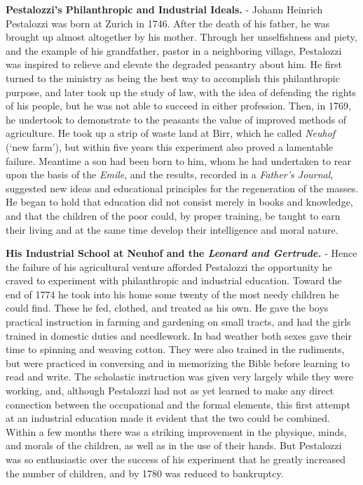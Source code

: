 \documentclass[]{book}
\begin{document}
\textbf{Pestalozzi's Philanthropic and Industrial Ideals.} - Johann Heinrich Pestalozzi was born at Zurich in 1746. After the death of his father, he was brought up almost altogether by his mother. Through her unselfishness and piety, and the example of his grandfather, pastor in a neighboring village, Pestalozzi was inspired to relieve and elevate the degraded peasantry about him. He first turned to the ministry as being the best way to accomplish this philanthropic purpose, and later took up the study of law, with the idea of defending the rights of his people, but he was not able to succeed in either profession. Then, in 1769, he undertook to demonstrate to the peasants the value of improved methods of agriculture. He took up a strip of waste land at Birr, which he called \emph{Neuhof} (`new farm'), but within five years this experiment also proved a lamentable failure. Meantime a son had been born to him, whom he had undertaken to rear upon the basis of the \emph{Emile}, and the results, recorded in a \emph{Father's Journal}, suggested new ideas and educational principles for the regeneration of the masses. He began to hold that education did not consist merely in books and knowledge, and that the children of the poor could, by proper training, be taught to earn their living and at the same time develop their intelligence and moral nature.

\textbf{His Industrial School at Neuhof and the \emph{Leonard and Gertrude.}} - Hence the failure of his agricultural venture afforded Pestalozzi the opportunity he craved to experiment with philanthropic and industrial education. Toward the end of 1774 he took into his home some twenty of the most needy children he could find. These he fed, clothed, and treated as his own. He gave the boys practical instruction in farming and gardening on small tracts, and had the girls trained in domestic duties and needlework. In bad weather both sexes gave their time to spinning and weaving cotton. They were also trained in the rudiments, but were practiced in conversing and in memorizing the Bible before learning to read and write. The scholastic instruction was given very largely while they were working, and, although Pestalozzi had not as yet learned to make any direct connection between the occupational and the formal elements, this first attempt at an industrial education made it evident that the two could be combined. Within a few months there was a striking improvement in the physique, minds, and morals of the children, as well as in the use of their hands. But Pestalozzi was so enthusiastic over the success of his experiment that he greatly increased the number of children, and by 1780 was reduced to bankruptcy.
\end{document}
